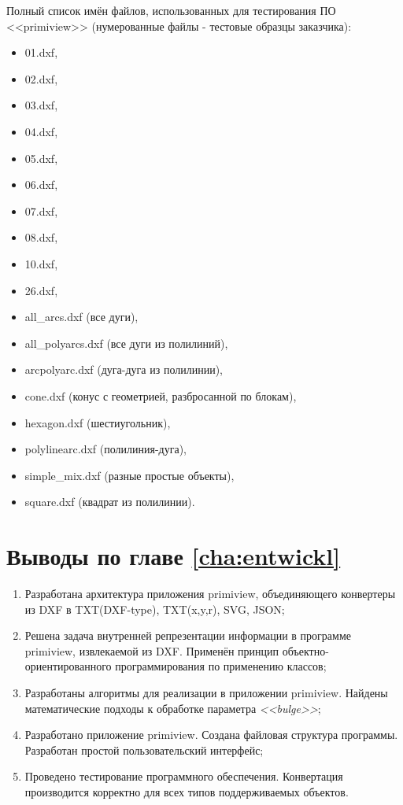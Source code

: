 Полный список имён файлов, использованных для тестирования ПО <<primiview>> (нумерованные файлы - тестовые образцы заказчика):
\begin{itemize}
	\item 01.dxf,
	\item 02.dxf,
	\item 03.dxf,
	\item 04.dxf,
	\item 05.dxf,
	\item 06.dxf,
	\item 07.dxf,
	\item 08.dxf,
	\item 10.dxf,
	\item 26.dxf,
	\item all\_arcs.dxf  (все дуги),
	\item all\_polyarcs.dxf (все дуги из полилиний),
	\item arcpolyarc.dxf (дуга-дуга из полилинии),
	\item cone.dxf (конус с геометрией, разбросанной по блокам),
	\item hexagon.dxf (шестиугольник),
	\item polylinearc.dxf (полилиния-дуга),
	\item simple\_mix.dxf (разные простые объекты),
	\item square.dxf (квадрат из полилинии).
\end{itemize}

\section{Выводы по главе \ref{cha:entwickl}}

\begin{enumerate}[1)]
	\item Разработана архитектура приложения primiview, объединяющего конвертеры из DXF в TXT(DXF-type), TXT(x,y,r), SVG, JSON;
	\item Решена задача внутренней репрезентации информации в программе primiview, извлекаемой из DXF. Применён принцип объектно-ориентированного программирования по применению классов;
	\item Разработаны алгоритмы для реализации в приложении primiview. Найдены математические подходы к обработке параметра \textit{<<bulge>>};
	\item Разработано приложение primiview. Создана файловая структура программы. Разработан простой пользовательский интерфейс;
	\item Проведено тестирование программного обеспечения. Конвертация производится корректно для всех типов поддерживаемых объектов.
\end{enumerate}
